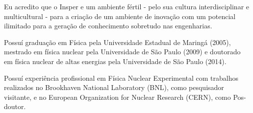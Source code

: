 Eu acredito que o Insper e um ambiente fértil - pelo sua cultura interdisciplinar e multicultural - para a criação de um ambiente de inovação com um potencial ilimitado para a geração de conhecimento sobretudo nas engenharias.


Possuí graduação em Física pela Universidade Estadual de Maringá (2005), mestrado em física nuclear pela Universidade de São Paulo (2009) e doutorado em física nuclear de altas energias pela Universidade de São Paulo (2014). 

Possuí experiência profissional em Física Nuclear Experimental com trabalhos realizados no Brookhaven National Laboratory (BNL), como pesquisador visitante, e no European Organization for Nuclear Research (CERN), como Pos- doutor.